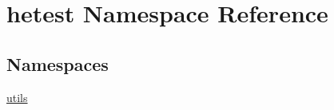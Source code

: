 \hypertarget{namespacehetest}{\section{hetest Namespace Reference}
\label{namespacehetest}
}
\subsection*{Namespaces}
\begin{DoxyCompactItemize}
\item 
\hyperlink{namespacehetest_1_1utils}{utils}
\end{DoxyCompactItemize}
